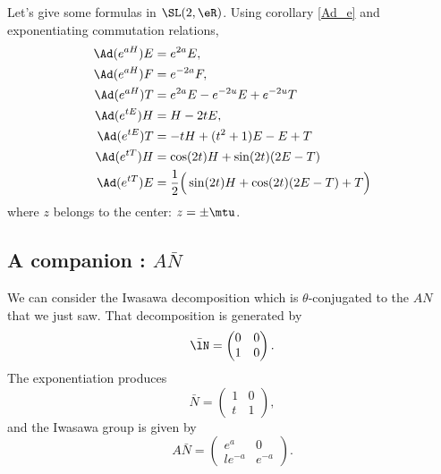 Let's give some formulas in $\SL(2,\eR)$. Using corollary \ref{Ad_e} and exponentiating commutation relations,
\begin{subequations}  \label{eq_eaHsldr}
\begin{align}
\Ad(e^{aH})E&=e^{2a}E,\\
\Ad(e^{aH})F&=e^{-2a}F,\\
\Ad( e^{aH})T&= e^{2a}E- e^{-2u}E+ e^{-2u}T\\
\Ad(e^{tE})H&=H-2tE,                            \label{eq_AdetE}\\
\Ad( e^{tE})T&=-tH+(t^2+1)E-E+T\\
\Ad( e^{tT})H&=\cos(2t)H+\sin(2t)(2E-T)\\
\Ad( e^{tT})E&=\frac{ 1 }{2}\Big( \sin(2t)H+\cos(2t)(2E-T)+T \Big)
\end{align}
\end{subequations}
where $z$ belongs to the center: $z=\pm\mtu$.

                    \subsection{A companion : \texorpdfstring{$A\bar N$}{AN}}

We can consider the Iwasawa decomposition which is $\theta$-conjugated to the $AN$ that we just saw. That decomposition is generated by
\begin{equation}
    \bar\lN=\begin{pmatrix}
    0   &   0   \\ 
    1   &   0
\end{pmatrix}.
\end{equation}
The exponentiation produces
\begin{equation}
    \bar N=\begin{pmatrix}
    1   &   0   \\ 
    t   &   1   
\end{pmatrix},
\end{equation}
and the Iwasawa group is given by
\begin{equation}        \label{EqGeneANbarSLdeuxR}
    A\bar N=\begin{pmatrix}
    e^a &   0   \\ 
    l e^{-a}    &    e^{-a} 
\end{pmatrix}.
\end{equation}

